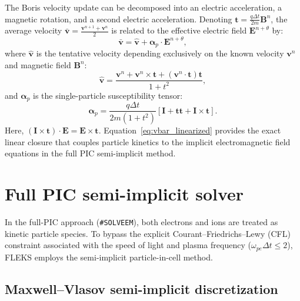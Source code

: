\documentclass[a4paper, 11pt]{article}
\begin{document}
The Boris velocity update can be decomposed into an electric acceleration, a magnetic rotation, and a second electric acceleration. Denoting $\mathbf{t} = \frac{q\Delta t}{2m}\mathbf{B}^n$, the average velocity $\bar{\mathbf{v}} = \frac{\mathbf{v}^{n+1} + \mathbf{v}^n}{2}$ is related to the effective electric field $\mathbf{E}^{n+\theta}$ by:
\begin{equation}
\bar{\mathbf{v}} = \hat{\mathbf{v}} + \boldsymbol{\alpha}_p \cdot \mathbf{E}^{n+\theta},
\label{eq:vbar_linearized}
\end{equation}
where $\hat{\mathbf{v}}$ is the tentative velocity depending exclusively on the known velocity $\mathbf{v}^n$ and magnetic field $\mathbf{B}^n$:
\begin{equation}
\hat{\mathbf{v}} = \frac{\mathbf{v}^n + \mathbf{v}^n \times \mathbf{t} + (\mathbf{v}^n \cdot \mathbf{t})\mathbf{t}}{1 + t^2},
\end{equation}
and $\boldsymbol{\alpha}_p$ is the single-particle susceptibility tensor:
\begin{equation}
\boldsymbol{\alpha}_p = \frac{q\Delta t}{2m(1 + t^2)} \left[ \mathbf{I} + \mathbf{t}\mathbf{t} + \mathbf{I} \times \mathbf{t} \right].
\end{equation}
Here, $(\mathbf{I} \times \mathbf{t}) \cdot \mathbf{E} = \mathbf{E} \times \mathbf{t}$. Equation~\eqref{eq:vbar_linearized} provides the exact linear closure that couples particle kinetics to the implicit electromagnetic field equations in the full PIC semi-implicit method.

\section{Full PIC semi-implicit solver}

In the full-PIC approach (\texttt{\#SOLVEEM}), both electrons and ions are treated as kinetic particle species. To bypass the explicit Courant--Friedrichs--Lewy (CFL) constraint associated with the speed of light and plasma frequency ($\omega_{pe}\Delta t \le 2$), FLEKS employs the semi-implicit particle-in-cell method.

\subsection{Maxwell--Vlasov semi-implicit discretization}
\end{document}
